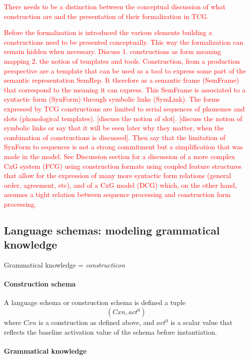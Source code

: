 \documentclass{article}
\newcommand\todo[1]{\textcolor{red}{#1}}
\begin{document}
\todo{There needs to be a distinction between the conceptual discussion of what construction are and the presentation of their formalization in TCG.}

\todo{Before the formalization is introduced the various elements building a constructions need to be presented conceptually. This way the formalization can remain hidden when necessary. Discuss 1. constructions as form meaning mapping 2. the notion of templates and tools. Construction, from a production perspective are a template that can be used as a tool to express some part of the semantic representation SemRep. It therefore as a semantic frame (SemFrame) that correspond to the meaning it can express. This SemFrame is associated to a syntactic form (SynForm) through symbolic links (SymLink). The forms expressed by TCG constructions are limited to serial sequences of phonemes and slots (phonological templates). [discuss the notion of slot]. [discuss the notion of symbolic links or say that it will be seen later why they matter, when the combination of constructions is discussed]. Then say that the limitation of SynForm to sequences is not a strong commitment but a simplification that was made in the model. See Discussion section for a discussion of a more complex CxG system (FCG) using construction formats using coupled feature structures that allow for the expression of many more syntactic form relations (general order, agreement, etc), and of a CxG model (DCG) which, on the other hand, assumes a tight relation between sequence processing and construction form processing.}


\subsection{Language schemas: modeling grammatical knowledge}
Grammatical knowledge = \emph{constructicon}

\paragraph{Construction schema}

A language schema or construction schema is defined a tuple $$(Cxn, act^0)$$ where $Cxn$ is a construction as defined above, and $act^0$ is a scalar value that reflects the baseline activation value of the schema before instantiation.

\paragraph{Grammatical knowledge}
\end{document}
